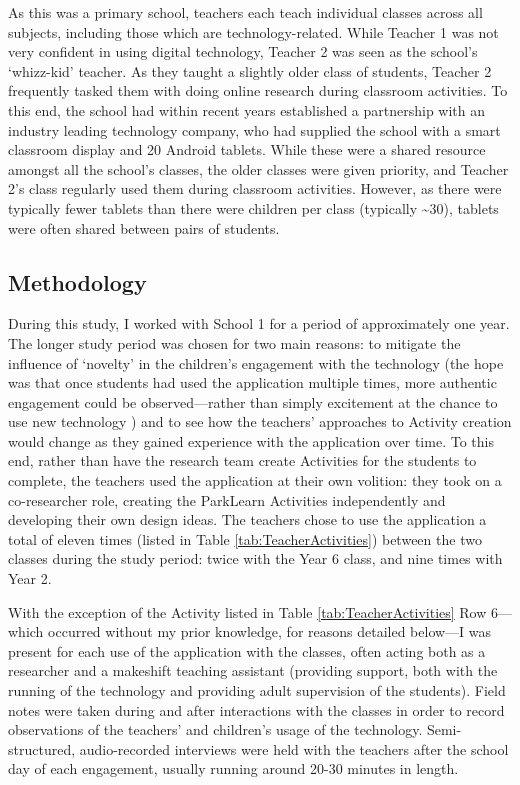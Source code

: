 As this was a primary school, teachers each teach individual classes across all subjects, including those which are technology-related. While Teacher 1 was not very confident in using digital technology, Teacher 2 was seen as the school's `whizz-kid' teacher. As they taught a slightly older class of students, Teacher 2 frequently tasked them with doing online research during classroom activities. To this end, the school had within recent years established a partnership with an industry leading technology company, who had supplied the school with a smart classroom display and 20 Android tablets. While these were a shared resource amongst all the school’s classes, the older classes were given priority, and Teacher 2's class regularly used them during classroom activities. However, as there were typically fewer tablets than there were children per class (typically \textasciitilde{}30), tablets were often shared between pairs of students.

\subsection{Methodology}

During this study, I worked with School 1 for a period of approximately one year. The longer study period was chosen for two main reasons: to mitigate the influence of `novelty' in the children’s engagement with the technology (the hope was that once students had used the application multiple times, more authentic engagement could be observed---rather than simply excitement at the chance to use new technology \citep{Sharples2013}) and to see how the teachers' approaches to Activity creation would change as they gained experience with the application over time. To this end, rather than have the research team create Activities for the students to complete, the teachers used the application at their own volition: they took on a co-researcher role, creating the ParkLearn Activities independently and developing their own design ideas. The teachers chose to use the application a total of eleven times (listed in Table \ref{tab:TeacherActivities}) between the two classes during the study period: twice with the Year 6 class, and nine times with Year 2.

With the exception of the Activity listed in Table \ref{tab:TeacherActivities} Row 6---which occurred without my prior knowledge, for reasons detailed below---I was present for each use of the application with the classes, often acting both as a researcher and a makeshift teaching assistant (providing support, both with the running of the technology and providing adult supervision of the students). Field notes were taken during and after interactions with the classes in order to record observations of the teachers' and children's usage of the technology. Semi-structured, audio-recorded interviews were held with the teachers after the school day of each engagement, usually running around 20-30 minutes in length.

